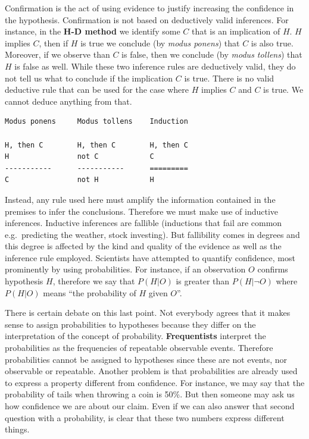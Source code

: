 \documentclass[
]{book}
\begin{document}
Confirmation is the act of using evidence to justify increasing the confidence in the hypothesis.
Confirmation is not based on deductively valid inferences. For instance, in the \textbf{H-D method} we identify some \(C\) that is an implication of \(H\). \(H\) implies \(C\), then if \(H\) is true we conclude (by \emph{modus ponens}) that \(C\) is also true. Moreover, if we observe than \(C\) is false, then we conclude (by \emph{modus tollens}) that \(H\) is false as well. While these two inference rules are deductively valid, they do not tell us what to conclude if the implication \(C\) is true. There is no valid deductive rule that can be used for the case where \(H\) implies \(C\) and \(C\) is true. We cannot deduce anything from that.

\begin{verbatim}
Modus ponens     Modus tollens    Induction

H, then C        H, then C        H, then C
H                not C            C
-----------      -----------      =========
C                not H            H 
\end{verbatim}

Instead, any rule used here must amplify the information contained in the premises to infer the conclusions. Therefore we must make use of inductive inferences. Inductive inferences are fallible (inductions that fail are common e.g.~predicting the weather, stock investing). But fallibility comes in degrees and this degree is affected by the kind and quality of the evidence as well as the inference rule employed. Scientists have attempted to quantify confidence, most prominently by using probabilities. For instance, if an observation \(O\) confirms hypothesis \(H\), therefore we say that \(P(H|O)\) is greater than \(P(H|\lnot O)\) where \(P(H|O)\) means ``the probability of \(H\) given \(O\)''.

There is certain debate on this last point. Not everybody agrees that it makes sense to assign probabilities to hypotheses because they differ on the interpretation of the concept of probability. \textbf{Frequentists} interpret the probabilities as the frequencies of repeatable observable events. Therefore probabilities cannot be assigned to hypotheses since these are not events, nor observable or repeatable. Another problem is that probabilities are already used to express a property different from confidence. For instance, we may say that the probability of tails when throwing a coin is 50\%. But then someone may ask us how confidence we are about our claim. Even if we can also answer that second question with a probability, is clear that these two numbers express different things.
\end{document}
